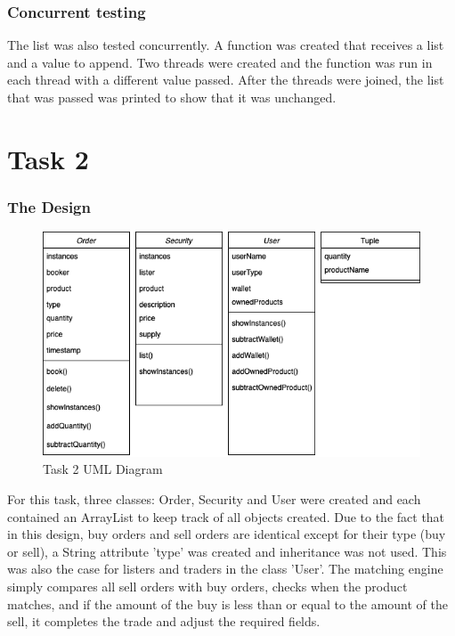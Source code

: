 \documentclass[a4paper, 12pt]{report}
\begin{document}
\subsubsection{Concurrent testing}
The list was also tested concurrently. A function was created that receives a list and a value to append. Two threads were created and the function was run in each thread with a different value passed. After the threads were joined, the list that was passed was printed to show that it was unchanged.

\section{Task 2}

\subsubsection{The Design}
\begin{figure}[H]
    \centering
    \includegraphics[width=1\textwidth]{"UML 2"}
    \caption{Task 2 UML Diagram}
\end{figure}

For this task, three classes: Order, Security and User were created and each contained an ArrayList to keep track of all objects created. Due to the fact that in this design, buy orders and sell orders are identical except for their type (buy or sell), a String attribute 'type' was created and inheritance was not used. This was also the case for listers and traders in the class 'User'.
\linebreak
The matching engine simply compares all sell orders with buy orders, checks when the product matches, and if the amount of the buy is less than or equal to the amount of the sell, it completes the trade and adjust the required fields.
\end{document}
